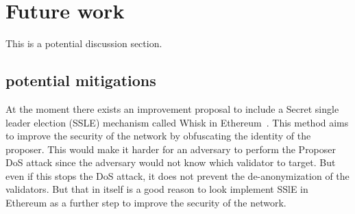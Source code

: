 

\section{Future work}\label{sec:future-works}
This is a potential discussion section.

\subsection{potential mitigations}\label{subsec:potential-mitigations}
At the moment there exists an improvement proposal to include a Secret single leader election (SSLE) mechanism called Whisk in Ethereum~\cite{EthereumResearchSSLE2024}.
This method aims to improve the security of the network by obfuscating the identity of the proposer.
This would make it harder for an adversary to perform the Proposer DoS attack since the adversary would not know which validator to target.
But even if this stops the DoS attack, it does not prevent the de-anonymization of the validators.
But that in itself is a good reason to look implement SSlE in Ethereum as a further step to improve the security of the network.

